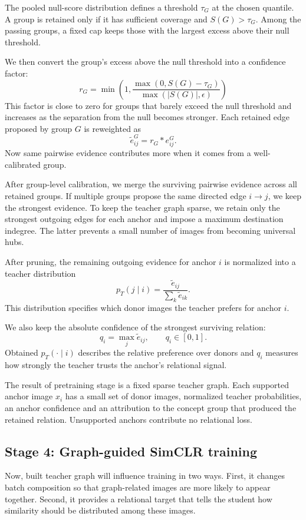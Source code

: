 \documentclass{article}
\begin{document}
The pooled null-score distribution defines a threshold $\tau_G$ at the chosen
quantile. A group is retained only if it has sufficient coverage and $S(G) > \tau_G$. Among the passing groups, a fixed cap keeps those with the largest excess above their null threshold.

We then convert the group's excess above the null threshold into a confidence factor:
\begin{equation}
 r_G=\min\!\left(1,\frac{\max(0,S(G)-\tau_G)}{\max(|S(G)|,\epsilon)}\right)
\end{equation}
This factor is close to zero for groups that barely exceed the null threshold and increases as the separation from the null becomes stronger. Each retained edge proposed by group $G$ is reweighted as
\[
\tilde e_{ij}^{G}=r_G * e_{ij}^{G}.
\]
Now same pairwise evidence contributes more when it comes from a well-calibrated group. 

After group-level calibration, we merge the surviving pairwise evidence across all retained groups. If multiple groups propose the same directed edge $i\rightarrow j$, we keep the strongest evidence. To keep the teacher graph sparse, we retain only the strongest outgoing edges for each anchor and impose a maximum destination indegree. The latter prevents a small number of images from becoming universal hubs.
 
After pruning, the remaining outgoing evidence for anchor $i$ is normalized into a teacher distribution
\[
p_T(j\mid i) = \frac{\tilde e_{ij}} {\sum_k \tilde e_{ik}}.
\]
This distribution specifies which donor images the teacher prefers for anchor $i$.

We also keep the absolute confidence of the strongest surviving relation:
\[
q_i=\max_j \tilde e_{ij}, \qquad q_i\in[0,1].
\]
Obtained $p_T(\cdot\mid i)$ describes the relative preference over donors and $q_i$ measures how strongly the teacher trusts the anchor's relational signal.

The result of pretraining stage is a fixed sparse teacher graph. Each supported anchor image $x_i$ has a small set of donor images, normalized teacher probabilities, an anchor confidence and an attribution to the concept group that produced the retained relation. Unsupported anchors contribute no relational loss.

\subsection{Stage 4: Graph-guided SimCLR training}
Now, built teacher graph will influence training in two ways. First, it changes batch composition so that graph-related images are more likely to appear together. Second, it provides a relational target that tells the student how similarity should be distributed among these images.
\end{document}
